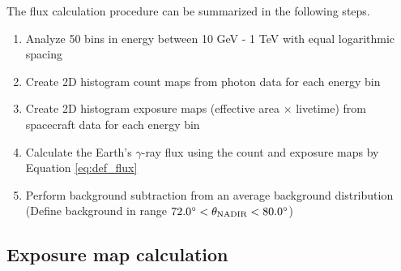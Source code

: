 The flux calculation procedure can be summarized in the following steps.
\begin{enumerate}
    \item Analyze 50 bins in energy
    between 10 GeV - 1 TeV with equal logarithmic spacing 
    \item Create 2D histogram count maps from photon
    data for each energy bin
    \item Create 2D histogram exposure maps
    (effective area $\times$ livetime) from spacecraft data
    for each energy bin
    \item Calculate the Earth's $\gamma$-ray flux using the count and exposure maps by Equation  \ref{eq:def_flux}
    \item Perform background subtraction from an average
    background distribution (Define background in range
    $72.0^\circ < \theta_{\rm NADIR} < 80.0^\circ$)
\end{enumerate}


\subsection{Exposure map calculation}

